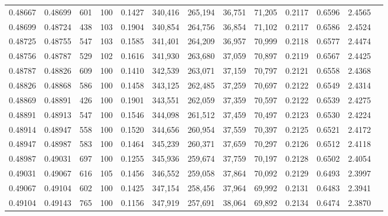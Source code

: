 \begin{tabular}{rrrrrrrrrrrrr}
0.48667 & 0.48699 &   601 & 100 &                                     0.1427 & 340,416 & 265,194 &  36,751 &  71,205 & 0.2117 & 0.6596 & 2.4565 \\
0.48699 & 0.48724 &   438 & 103 &                                     0.1904 & 340,854 & 264,756 &  36,854 &  71,102 & 0.2117 & 0.6586 & 2.4524 \\
0.48725 & 0.48755 &   547 & 103 &                                     0.1585 & 341,401 & 264,209 &  36,957 &  70,999 & 0.2118 & 0.6577 & 2.4474 \\
0.48756 & 0.48787 &   529 & 102 &                                     0.1616 & 341,930 & 263,680 &  37,059 &  70,897 & 0.2119 & 0.6567 & 2.4425 \\
0.48787 & 0.48826 &   609 & 100 &                                     0.1410 & 342,539 & 263,071 &  37,159 &  70,797 & 0.2121 & 0.6558 & 2.4368 \\
0.48826 & 0.48868 &   586 & 100 &                                     0.1458 & 343,125 & 262,485 &  37,259 &  70,697 & 0.2122 & 0.6549 & 2.4314 \\
0.48869 & 0.48891 &   426 & 100 &                                     0.1901 & 343,551 & 262,059 &  37,359 &  70,597 & 0.2122 & 0.6539 & 2.4275 \\
0.48891 & 0.48913 &   547 & 100 &                                     0.1546 & 344,098 & 261,512 &  37,459 &  70,497 & 0.2123 & 0.6530 & 2.4224 \\
0.48914 & 0.48947 &   558 & 100 &                                     0.1520 & 344,656 & 260,954 &  37,559 &  70,397 & 0.2125 & 0.6521 & 2.4172 \\
0.48947 & 0.48987 &   583 & 100 &                                     0.1464 & 345,239 & 260,371 &  37,659 &  70,297 & 0.2126 & 0.6512 & 2.4118 \\
0.48987 & 0.49031 &   697 & 100 &                                     0.1255 & 345,936 & 259,674 &  37,759 &  70,197 & 0.2128 & 0.6502 & 2.4054 \\
0.49031 & 0.49067 &   616 & 105 &                                     0.1456 & 346,552 & 259,058 &  37,864 &  70,092 & 0.2129 & 0.6493 & 2.3997 \\
0.49067 & 0.49104 &   602 & 100 &                                     0.1425 & 347,154 & 258,456 &  37,964 &  69,992 & 0.2131 & 0.6483 & 2.3941 \\
0.49104 & 0.49143 &   765 & 100 &                                     0.1156 & 347,919 & 257,691 &  38,064 &  69,892 & 0.2134 & 0.6474 & 2.3870 \\

\end{tabular}
